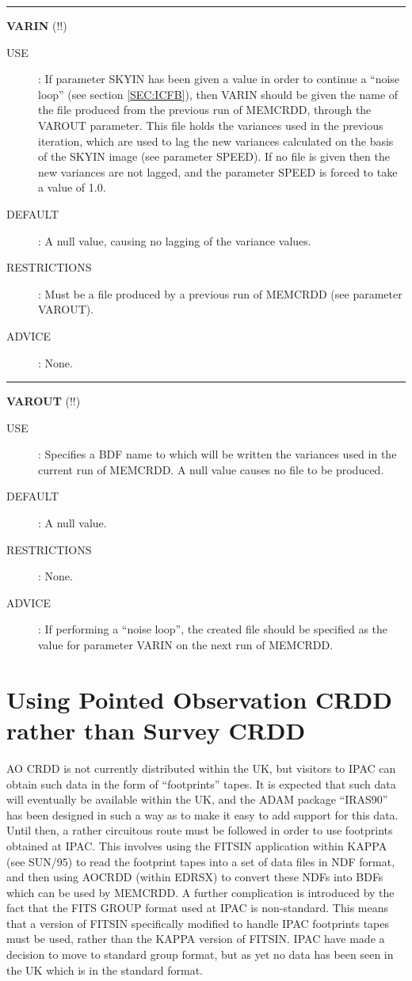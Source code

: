 \rule{\textwidth}{0.3mm}
{\Large {\bf VARIN} (!!)}
\begin{description}
\item [USE]:
If parameter SKYIN has been given a value in order to continue a ``noise loop''
(see section \ref {SEC:ICFB}), then VARIN should be given the name of the file
produced from the previous run of MEMCRDD, through the VAROUT parameter. This
file holds the variances used in the previous iteration, which are used to lag
the new variances calculated on the basis of the SKYIN image (see parameter
SPEED). If no file is given then the new variances are not lagged, and the
parameter SPEED is forced to take a value of 1.0.
\item [DEFAULT]:
A null value, causing no lagging of the variance values.
\item [RESTRICTIONS]:
Must be a file produced by a previous run of MEMCRDD (see parameter VAROUT).
\item [ADVICE]:
None.
\end {description}

\rule{\textwidth}{0.3mm}
{\Large {\bf VAROUT} (!!)}
\begin{description}
\item [USE]:
Specifies a BDF name to which will be written the variances used in the
current run of MEMCRDD. A null value causes no file to be produced.
\item [DEFAULT]:
A null value.
\item [RESTRICTIONS]:
None.
\item [ADVICE]:
If performing a ``noise loop'', the created file should be specified as the
value for parameter VARIN on the next run of MEMCRDD.
\end {description}

\section{Using Pointed Observation CRDD rather than Survey CRDD}
\label {APP:AO}

AO CRDD is not currently distributed within the UK, but visitors to IPAC
can obtain such data in the form of ``footprints'' tapes. It is expected
that such data will eventually be available within the UK, and the ADAM
package ``IRAS90'' has been designed in such a way as to make it easy
to add support for this data. Until then, a rather circuitous route must
be followed in order to use footprints obtained at IPAC. This involves
using the FITSIN application within KAPPA (see SUN/95) to read the
footprint tapes into a set of data files in NDF format, and then using
AOCRDD (within EDRSX) to convert these NDFs into BDFs which can be used
by MEMCRDD. A further complication is introduced by the fact that the
FITS GROUP format used at IPAC is non-standard. This means that a version
of FITSIN specifically modified to handle IPAC footprints tapes must be used,
rather than the KAPPA version of FITSIN. IPAC have made a decision to move
to standard group format, but as yet no data has been seen in the UK which
is in the standard format.

